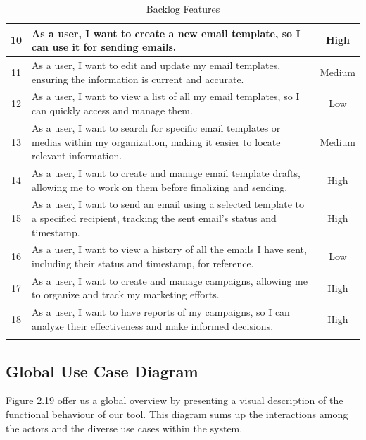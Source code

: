 \begin{longtable}{|c|p{}|c|}
	\hline
	10          & As a user, I want to create a new email template, so I can use it for sending emails. & High \\
	\hline
	11          & As a user, I want to edit and update my email templates, ensuring the information is current and accurate. & Medium \\
	\hline
	12          & As a user, I want to view a list of all my email templates, so I can quickly access and manage them. & Low \\
	\hline
	13          & As a user, I want to search for specific email templates or medias within my organization, making it easier to locate relevant information. & Medium \\
	\hline
	14          & As a user, I want to create and manage email template drafts, allowing me to work on them before finalizing and sending. & High \\
	\hline
	15          & As a user, I want to send an email using a selected template to a specified recipient, tracking the sent email's status and timestamp. & High \\
	\hline
	16          & As a user, I want to view a history of all the emails I have sent, including their status and timestamp, for reference. & Low \\
	\hline
	17          & As a user, I want to create and manage campaigns, allowing me to organize and track my marketing efforts. & High \\
	\hline
	18          & As a user, I want to have reports of my campaigns, so I can analyze their effectiveness and make informed decisions. & High \\
	\hline
	\caption{Backlog Features}
	\label{tab:Backlog Features}
\end{longtable}


\newpage

\subsection{Global Use Case Diagram}
Figure 2.19 offer us a global overview by presenting a visual description of the functional
behaviour of our tool. This diagram sums up the interactions among the actors and the
diverse use cases within the system.


